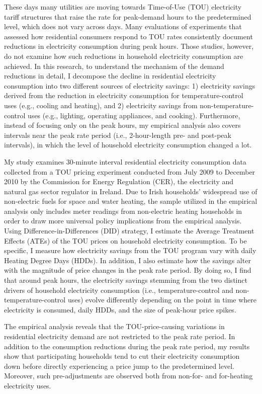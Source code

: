 These days many utilities are moving towards Time-of-Use (TOU) electricity tariff structures that raise the rate for peak-demand hours to the predetermined level, which does not vary across days. Many evaluations of experiments that assessed how residential consumers respond to TOU rates consistently document reductions in electricity consumption during peak hours. Those studies, however, do not examine how such reductions in household electricity consumption are achieved. In this research, to understand the mechanism of the demand reductions in detail, I decompose the decline in residential electricity consumption into two different sources of electricity savings: 1) electricity savings derived from the reduction in electricity consumption for temperature-control uses (e.g., cooling and heating), and 2) electricity savings from non-temperature-control uses (e.g., lighting, operating appliances, and cooking). Furthermore, instead of focusing only on the peak hours, my empirical analysis also covers intervals near the peak rate period (i.e., 2-hour-length pre- and post-peak intervals), in which the level of household electricity consumption changed a lot.

My study examines 30-minute interval residential electricity consumption data collected from a TOU pricing experiment conducted from July 2009 to December 2010 by the Commission for Energy Regulation (CER), the electricity and natural gas sector regulator in Ireland. Due to Irish households' widespread use of non-electric fuels for space and water heating, the sample utilized in the empirical analysis only includes meter readings from non-electric heating households in order to draw more universal policy implications from the empirical analysis. Using Difference-in-Differences (DID) strategy, I estimate the Average Treatment Effects (ATEs) of the TOU prices on household electricity consumption. To be specific, I measure how electricity savings from the TOU program vary with daily Heating Degree Days (HDDs). In addition, I also estimate how the savings alter with the magnitude of price changes in the peak rate period. By doing so, I find that around peak hours, the electricity savings stemming from the two distinct drivers of household electricity consumption (i.e., temperature-control and non-temperature-control uses) evolve differently depending on the point in time where electricity is consumed, daily HDDs, and the size of peak-hour price spikes.

The empirical analysis reveals that the TOU-price-causing variations in residential electricity demand are not restricted to the peak rate period. In addition to the consumption reductions during the peak rate period, my results show that participating households tend to cut their electricity consumption down before directly experiencing a price jump to the predetermined level. Moreover, such pre-adjustments are observed both from non-for- and for-heating electricity uses. 

